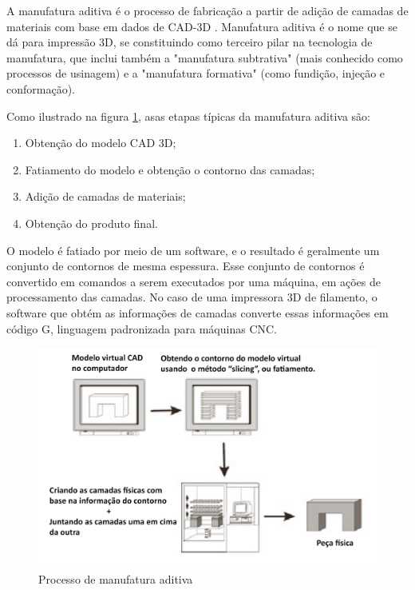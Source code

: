 A manufatura aditiva é o processo de fabricação a partir de adição de camadas de materiais com base em dados de
CAD-3D \cite{manufatura_aditiva}. Manufatura aditiva é o nome que se dá para impressão 3D, se constituindo como
terceiro pilar na tecnologia de manufatura, que inclui também a "manufatura subtrativa" (mais conhecido como processos
de usinagem) e a "manufatura formativa" (como fundição, injeção e conformação).

Como ilustrado na figura \ref{fig:manufatura_aditiva}, asas etapas típicas da manufatura aditiva são:

\begin{enumerate}
	\item Obtenção do modelo CAD 3D;
	\item Fatiamento do modelo e obtenção o contorno das camadas;
	\item Adição de camadas de materiais;
	\item Obtenção do produto final.
\end{enumerate}

O modelo é fatiado por meio de um software, e o resultado é geralmente um conjunto de contornos de mesma espessura.
Esse conjunto de contornos é convertido em comandos a serem executados por uma máquina, em ações de processamento das
camadas. No caso de uma impressora 3D de filamento, o software que obtém as informações de camadas converte essas
informações em código G, linguagem padronizada para máquinas CNC.

\begin{figure}[h]
	\centering
	\includegraphics[width=1\textwidth]{figures/manufatura_aditiva}
	\caption{Processo de manufatura aditiva \cite{manufatura_aditiva}}
	\label{fig:manufatura_aditiva}
\end{figure}
